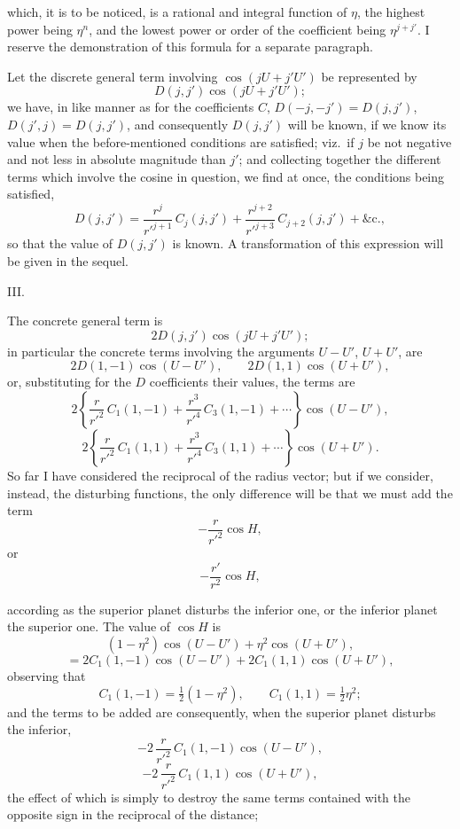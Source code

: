\documentclass[12pt,a4paper]{article}
\theoremstyle{plain}
\begin{document}
\newpage
{} which, it is to be noticed, is a rational and integral function of $\eta$, the highest power being $\eta^{n}$, and the lowest power or order of the coefficient being $\eta^{j+j'}$. I reserve the demonstration of this formula for a separate paragraph.

\medskip

Let the discrete general term involving $\cos(jU+j'U')$ be represented by
\[
D(j,j')\cos(jU+j'U');
\]
we have, in like manner as for the coefficients $C$, $D(-j,-j')=D(j,j')$, $D(j',j)=D(j,j')$, and consequently $D(j,j')$ will be known, if we know its value when the before-mentioned conditions are satisfied; viz.\ if $j$ be not negative and not less in absolute magnitude than $j'$; and collecting together the different terms which involve the cosine in question, we find at once, the conditions being satisfied,
\[
D(j,j')=\frac{r^{j}}{r'^{j+1}}\,C_{j}(j,j')+\frac{r^{j+2}}{r'^{j+3}}\,C_{j+2}(j,j')+\&\mathrm{c}.,
\]
so that the value of $D(j,j')$ is known. A transformation of this expression will be given in the sequel.

\bigskip

\begin{center}\textsc{III.}\end{center}

The concrete general term is
\[
2D(j,j')\cos(jU+j'U');
\]
in particular the concrete terms involving the arguments $U-U'$, $U+U'$, are
\[
2D(1,-1)\cos(U-U'),\qquad 2D(1,1)\cos(U+U'),
\]
or, substituting for the $D$ coefficients their values, the terms are
\[
2\left\{\frac{r}{r'^{2}}\,C_{1}(1,-1)+\frac{r^{3}}{r'^{4}}\,C_{3}(1,-1)+\cdots\right\}\cos(U-U'),
\]
\[
2\left\{\frac{r}{r'^{2}}\,C_{1}(1,1)+\frac{r^{3}}{r'^{4}}\,C_{3}(1,1)+\cdots\right\}\cos(U+U').
\]
So far I have considered the reciprocal of the radius vector; but if we consider, instead, the disturbing functions, the only difference will be that we must add the term
\[
-\frac{r}{r'^{2}}\cos H,
\]
or
\[
-\frac{r'}{r^{2}}\cos H,
\]

\newpage
{} according as the superior planet disturbs the inferior one, or the inferior planet the superior one. The value of $\cos H$ is
\[
(1-\eta^{2})\cos(U-U')+\eta^{2}\cos(U+U'),
\]
\[
=2C_{1}(1,-1)\cos(U-U')+2C_{1}(1,1)\cos(U+U'),
\]
observing that
\[
C_{1}(1,-1)=\tfrac{1}{2}(1-\eta^{2}),\qquad C_{1}(1,1)=\tfrac{1}{2}\eta^{2};
\]
and the terms to be added are consequently, when the superior planet disturbs the inferior,
\[
-2\,\frac{r}{r'^{2}}\,C_{1}(1,-1)\cos(U-U'),
\]
\[
-2\,\frac{r}{r'^{2}}\,C_{1}(1,1)\cos(U+U'),
\]
the effect of which is simply to destroy the same terms contained with the opposite sign in the reciprocal of the distance;
\end{document}
